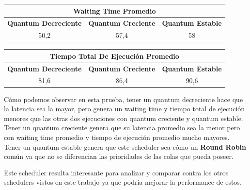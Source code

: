 \begin{center}
	\begin{tabular}{|c|c|c|}
		\hline
		\multicolumn{3}{|c|}{\large{\textbf{Waiting Time Promedio}}} \\
		\hline
		\textbf{Quantum Decreciente} & \textbf{Quantum Creciente} & \textbf{Quantum Estable} \\
		\hline
		50,2 & 57,4 & 58 \\
		\hline
	\end{tabular}
\end{center}

\begin{center}
	\begin{tabular}{|c|c|c|}
		\hline
		\multicolumn{3}{|c|}{\large{\textbf{Tiempo Total De Ejecución Promedio}}} \\
		\hline
		\textbf{Quantum Decreciente} & \textbf{Quantum Creciente} & \textbf{Quantum Estable} \\
		\hline
		81,6 & 86,4 & 90,6 \\
		\hline
	\end{tabular}
\end{center}

Cómo podemos observar en esta prueba, tener un quantum decreciente hace que la latencia sea la mayor, pero genera un waiting time y tiempo total de ejecución menores que las otras dos ejecuciones con quantum creciente y quantum estable. Tener un quantum creciente genera que su latencia promedio sea la menor pero con waiting time promedio y tiempo de ejecución promedio mucho mayores. Tener un quantum estable genera que este scheduler sea cómo un \textbf{Round Robin} común ya que no se diferencian las prioridades de las colas que pueda poseer.

Este scheduler resulta interesante para analizar y comparar contra los otros schedulers vistos en este trabajo ya que podría mejorar la performance de estos. 